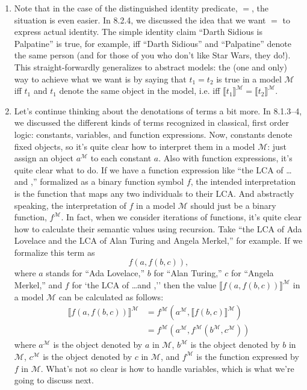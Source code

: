 \begin{enumerate}[\thesection.1]
	  \item Note that in the case of the distinguished identity predicate, $=$, the situation is even easier.
		In 8.2.4, we discussed the idea that we want $=$ to express actual identity.
		The simple identity claim ``Darth Sidious is Palpatine'' is true, for example, iff ``Darth Sidious'' and ``Palpatine'' denote the same person (and for those of you who don't like Star Wars, they do!).
		This straight-forwardly generalizes to abstract models: the (one and only) way to achieve what we want is by saying that $t_1=t_2$ is true in a model $\mathcal{M}$ iff $t_1$ and $t_1$ denote the same object in the model, i.e.
		iff
		$\llbracket t_1\rrbracket^\mathcal{M}=\llbracket t_2\rrbracket^\mathcal{M}$.
	
	  \item Let's continue thinking about the denotations of terms a bit more.
		In 8.1.3--4, we discussed the different kinds of terms recognized in classical, first order logic: constants, variables, and function expressions.
		Now, constants denote fixed objects, so it's quite clear how to interpret them in a model $\mathcal{M}$:
		just assign an object $a^\mathcal{M}$ to each constant $a$.
		Also with function expressions, it's quite clear what to do.
		If we have a function expression like ``the LCA of \dots and \underline{\phantom{\dots}},''
		formalized as a binary function symbol $f$,
		the intended interpretation is the function that maps any two individuals to their LCA.
		And abstractly speaking, the interpretation of $f$ in a model $\mathcal{M}$ should just be a binary function, $f^\mathcal{M}$.
		In fact,
		when we consider iterations of functions, it's quite clear how to calculate their semantic values using recursion.
		Take ``the LCA of Ada Lovelace and the LCA of Alan Turing and Angela Merkel,''
		for example.
		If we formalize this term as \[f(a,f(b,c)),\] where $a$ stands for ``Ada Lovelace,'' $b$ for ``Alan Turing,'' $c$ for ``Angela Merkel,'' and $f$ for `the LCA of \dots and \underline{\phantom{\dots}},''
		then the value $\llbracket f(a,f(b,c))\rrbracket^\mathcal{M}$ in a model $\mathcal{M}$ can be calculated as follows:
	\begin{align*}
	\llbracket f(a,f(b,c))\rrbracket^\mathcal{M}&=f^\mathcal{M}(a^\mathcal{M}, \llbracket f(b,c)\rrbracket^\mathcal{M})\\
	&=f^\mathcal{M}(a^\mathcal{M}, f^{\mathcal{M}}(b^\mathcal{M}, c^\mathcal{M}))
	\end{align*}
		where $a^\mathcal{M}$ is the object denoted by $a$ in
		$\mathcal{M}$, $b^\mathcal{M}$
		is the object denoted by $b$ in
		$\mathcal{M}$, $c^\mathcal{M}$
		is the object denoted by $c$ in $\mathcal{M}$,
		and $f^\mathcal{M}$ is the function expressed by $f$ in $\mathcal{M}$.
		What's not so clear is how to handle variables, which is what we're going to discuss next.
	

\end{enumerate}
